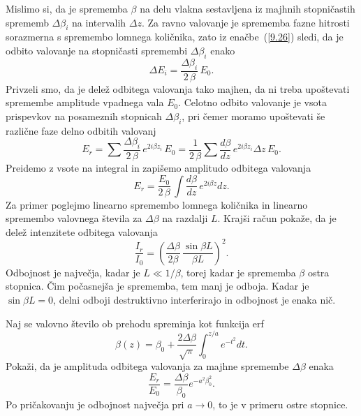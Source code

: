 Mislimo si, da je sprememba $\beta$ na delu vlakna sestavljena iz
majhnih stopničastih sprememb $\Delta\beta_{i}$ na intervalih $\Delta z$.
Za ravno valovanje je sprememba fazne hitrosti sorazmerna s spremembo
lomnega količnika, zato iz enačbe~(\ref{9.26}) sledi, da je odbito valovanje
na stopničasti spremembi $\Delta\beta_{i}$ enako
\begin{equation}
\Delta E_{i}=\frac{\Delta\beta_{i}}{2\,\beta}\, E_{0}.
\label{9.27}
\end{equation}
Privzeli smo, da je delež odbitega valovanja tako majhen, da ni treba upoštevati 
spremembe amplitude vpadnega vala $E_{0}$. Celotno odbito valovanje je vsota 
prispevkov na posameznih stopnicah $\Delta\beta_{i}$,
pri čemer moramo upoštevati še različne faze delno odbitih valovanj
\begin{equation}
E_{r}=\sum\frac{\Delta\beta_{i}}{2\,\beta}\, e^{2i\beta z_{i}}\, 
E_{0}=\frac{1}{2\,\beta}\sum\frac{d\beta}{dz}\, e^{2i\beta z_{i}}\Delta z\, E_{0}.
\label{9.28}
\end{equation}
Preidemo z vsote na integral in zapišemo amplitudo odbitega valovanja
\begin{equation}
E_{r}=\frac{E_{0}}{2\,\beta}\,\int\frac{d\beta}{dz}\, e^{2i\beta z}dz.
\label{9.29}
\end{equation}
Za primer poglejmo linearno spremembo lomnega količnika in linearno spremembo 
valovnega števila za $\Delta\beta$ na razdalji $L$. Krajši račun pokaže, da je 
delež intenzitete odbitega valovanja 
\begin{equation}
\frac{I_{r}}{I_{0}}=\left( \frac{\Delta\beta}{2 \beta}\,\frac{\sin\beta L}{\beta L}\right)^2\!.
\label{9.30}
\end{equation}
Odbojnost je največja, kadar je $L \ll 1/\beta$,
torej kadar je sprememba $\beta$ ostra stopnica. Čim počasnejša je
sprememba, tem manj je odboja. Kadar je $\sin\beta L=0$, delni 
odboji destruktivno interferirajo in odbojnost je enaka nič.

\begin{definition}
Naj se valovno število ob prehodu spreminja kot funkcija erf
\begin{equation}
\beta (z)= \beta_0 + \frac{2\Delta \beta}{\sqrt{\pi}} \int_0^{z/a} e^{-t^2}dt.
\end{equation}
Pokaži, da je amplituda 
odbitega valovanja za majhne spremembe $\Delta \beta$ enaka
\begin{equation}
\frac{E_r}{E_0} = \frac{\Delta \beta}{\beta_0}e^{-a^2\beta_0^2}.
\end{equation}
Po pričakovanju je odbojnost največja pri $a\to 0$, to je v primeru ostre stopnice.
\end{definition}
